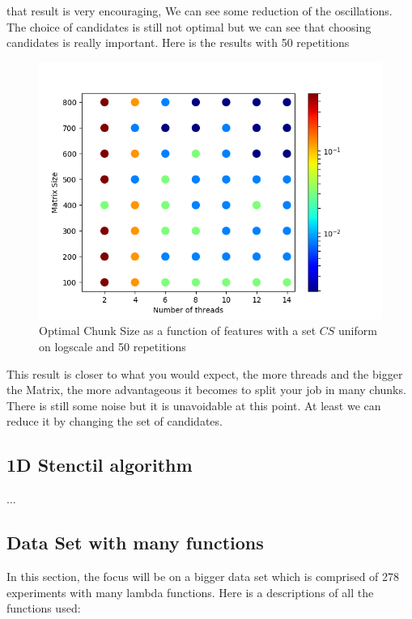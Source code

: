 \documentclass[12pt]{article}
\begin{document}
that result is very encouraging, We can see some reduction of the oscillations. The choice of candidates is still not optimal but we can see that choosing candidates is really important. Here is the results with 50 repetitions

\begin{figure}[H]
	\centering
	\includegraphics[width=120mm]{function_uniform_50.png}
	\caption{Optimal Chunk Size as a function of features with a set $CS$ uniform on logscale and 50 repetitions}
\end{figure}

This result is closer to what you would expect, the more threads and the bigger the Matrix, the more advantageous it becomes to split your job in many chunks. There is still some noise but it is unavoidable at this point. At least we can reduce it by changing the set of candidates.
\subsection{1D Stenctil algorithm}

...


\subsection{Data Set with many functions}
In this section, the focus will be on a bigger data set which is comprised of 278 experiments with many lambda functions. Here is a descriptions of all the functions used:
\end{document}

